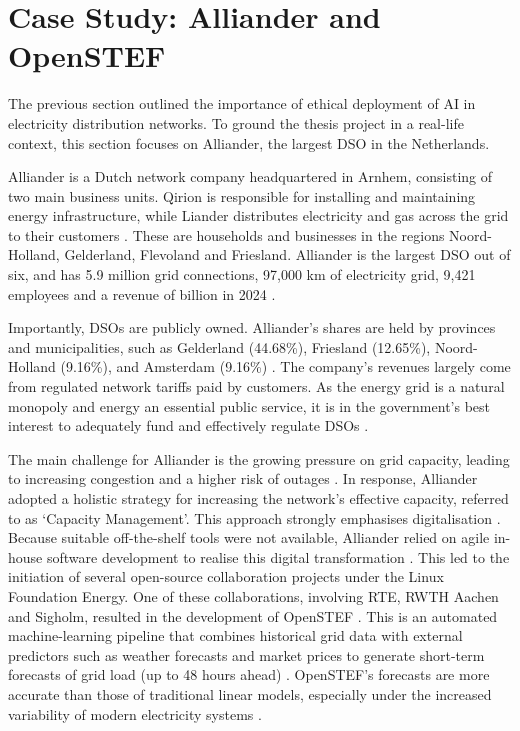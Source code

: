 \section{Case Study: Alliander and OpenSTEF}
\label{sec:alliander}

The previous section outlined the importance of ethical deployment of AI in electricity distribution networks. To ground the thesis project in a real-life context, this section focuses on Alliander, the largest DSO in the Netherlands.

Alliander is a Dutch network company headquartered in Arnhem, consisting of two main business units. Qirion is responsible for installing and maintaining energy infrastructure, while Liander distributes electricity and gas across the grid to their customers \autocite{Alliander2025c}. These are households and businesses in the regions Noord-Holland, Gelderland, Flevoland and Friesland. Alliander is the largest DSO out of six, and has 5.9 million grid connections, 97,000 km of electricity grid, 9,421 employees and a revenue of  billion in 2024 \autocite{AlliaderJaarverslag2025}.

Importantly, DSOs are publicly owned. Alliander's shares are held by provinces and municipalities, such as Gelderland (44.68\%), Friesland (12.65\%), Noord-Holland (9.16\%), and Amsterdam (9.16\%) \autocite{Aandeelhouders2025}. The company's revenues largely come from regulated network tariffs paid by customers. As the energy grid is a natural monopoly and energy an essential public service, it is in the government's best interest to adequately fund and effectively regulate DSOs \autocite{Loreti2024}.

The main challenge for Alliander is the growing pressure on grid capacity, leading to increasing congestion and a higher risk of outages \autocite{Alliander2025a, BlueGen2025}. In response, Alliander adopted a holistic strategy for increasing the network's effective capacity, referred to as `Capacity Management'. This approach strongly emphasises digitalisation \autocite{Alliander2024}. Because suitable off-the-shelf tools were not available, Alliander relied on agile in-house software development to realise this digital transformation \autocite{Eurelectric2025}. This led to the initiation of several open-source collaboration projects under the Linux Foundation Energy. One of these collaborations, involving RTE, RWTH Aachen and Sigholm, resulted in the development of OpenSTEF \autocite{Eurelectric2025}. This is an automated machine-learning pipeline that combines historical grid data with external predictors such as weather forecasts and market prices to generate short-term forecasts of grid load (up to 48 hours ahead) \autocite{GitHub2025}. OpenSTEF's forecasts are more accurate than those of traditional linear models, especially under the increased variability of modern electricity systems \autocite{LFEnergy2025, Dong2025}.


